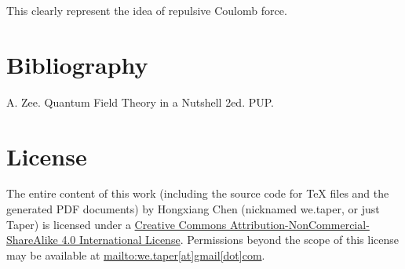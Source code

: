 \documentclass{book}
\numberwithin{equation}{subsection} %
\theoremstyle{definition}
\begin{document}
This clearly represent the idea of repulsive Coulomb force.
\chapter{Bibliography}
\begin{thebibliography}{1}
	 A. Zee. Quantum Field Theory in a Nutshell
		2ed. PUP.
\end{thebibliography}
\chapter{License}
The entire content of this work (including the source code
for TeX files and the generated PDF documents) by 
Hongxiang Chen (nicknamed we.taper, or just Taper) is
licensed under a 
\href{http://creativecommons.org/licenses/by-nc-sa/4.0/}{Creative 
	Commons Attribution-NonCommercial-ShareAlike 4.0 International 
	License}. Permissions beyond the scope of this 
license may be available at \url{mailto:we.taper[at]gmail[dot]com}.
\end{document}
